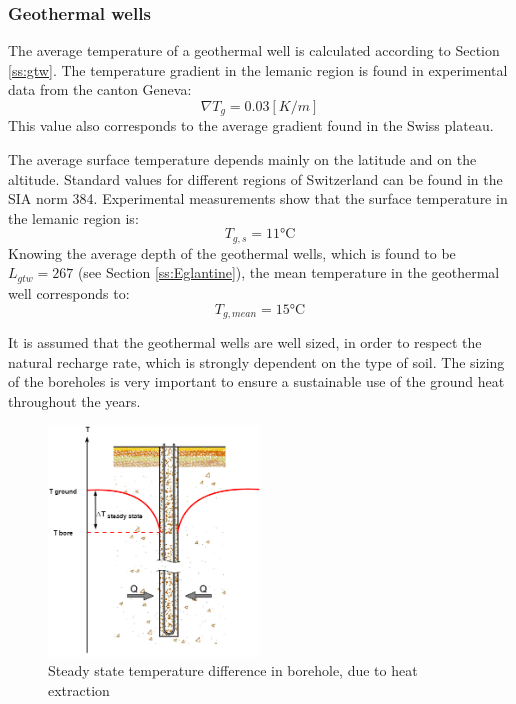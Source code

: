 \documentclass{article}
\begin{document}
\subsubsection{Geothermal wells}
The average temperature of a geothermal well is calculated according to Section \ref{ss:gtw}. The temperature gradient in the lemanic region is found in experimental data from the canton Geneva\cite{gadzEvaluationPotentielGeothermique2011}:
\begin{equation}
	\nabla T_{g} = 0.03 [K/m]
\end{equation}
This value also corresponds to the average gradient found in the Swiss plateau\cite{siaSIA384Sondes2010}.

The average surface temperature depends mainly on the latitude and on the altitude. Standard values for different regions of Switzerland can be found in the SIA norm 384\cite{siaSIA384Sondes2010}. Experimental measurements\cite{gadzEvaluationPotentielGeothermique2011} show that the surface temperature in the lemanic region is:
\begin{equation}
	T_{g,s} = 11 \si{\celsius}
\end{equation}
Knowing the average depth of the geothermal wells, which is found to be $L_{gtw} = 267$ (see Section \ref{ss:Eglantine}), the mean temperature in the geothermal well corresponds to:
\begin{equation}
	T_{g, mean} = 15 \si{\celsius}
\end{equation}

It is assumed that the geothermal wells are well sized, in order to respect the natural recharge rate, which is strongly dependent on the type of soil. The sizing of the boreholes is very important to ensure a sustainable use of the ground heat throughout the years. \\

\begin{figure}[htp]
	\centering
	\includegraphics[width=0.5\textwidth]{GTW_T_profile.png}
	\caption{Steady state temperature difference in borehole, due to heat extraction}
	\label{fig:GTW_T}
\end{figure}
\end{document}
